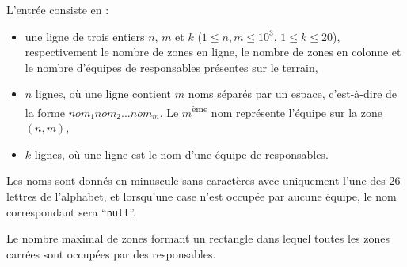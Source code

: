 \begin{Input}
	L'entrée consiste en :
	\begin{itemize}
		\item une ligne de trois entiers $n$, $m$ et $k$ ($1 \le n,m \le 10^3$, $1 \le k \le 20$),
respectivement le nombre de zones en ligne, le nombre de zones en colonne et le nombre d'équipes de responsables présentes sur le terrain,
		\item $n$ lignes, où une ligne contient $m$ noms séparés par un espace, c'est-à-dire de la forme $nom_1 nom_2 ... nom_m$. Le $m$\textsuperscript{ème} nom représente l'équipe sur la zone $(n,m)$,
		\item $k$ lignes, où une ligne est le nom d'une équipe de responsables.
	\end{itemize}
	Les noms sont donnés en minuscule sans caractères avec uniquement l'une des 26 lettres de l'alphabet, et lorsqu'une case n'est occupée par aucune équipe, le nom correspondant sera ``\verb|null|''.
\end{Input}

\begin{Output}
	Le nombre maximal de zones formant un rectangle dans lequel toutes les zones carrées sont occupées par des responsables.
\end{Output}
